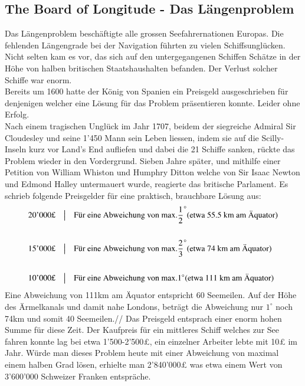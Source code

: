 \begin{refsection}
\section{The Board of Longitude - Das Längenproblem}
Das Längenproblem beschäftigte alle grossen Seefahrernationen Europas. Die fehlenden Längengrade bei der Navigation führten zu vielen Schiffsunglücken. Nicht selten kam es vor, das sich auf den untergegangenen Schiffen Schätze in der Höhe von halben britischen Staatshaushalten befanden. Der Verlust solcher Schiffe war enorm.\\
Bereits um 1600 hatte der König von Spanien ein Preisgeld ausgeschrieben für denjenigen welcher eine Lösung für das Problem präsentieren konnte. Leider ohne Erfolg. \\
Nach einem tragischen Unglück im Jahr 1707, beidem der siegreiche Admiral Sir Cloudesley und seine 1’450 Mann sein Leben liessen, indem sie auf die Scilly-Inseln kurz vor Land’s End aufliefen und dabei die 21 Schiffe sanken, rückte das Problem wieder in den Vordergrund.
Sieben Jahre später, und mithilfe einer Petition von William Whiston und Humphry Ditton welche von Sir Isaac Newton und Edmond Halley untermauert wurde, reagierte das britische Parlament.
Es schrieb folgende Preisgelder für eine praktisch, brauchbare Lösung aus:
\[
\begin{aligned}
&\text{20’000£}
&
&\text{\big \vert}
&
&\text{Für eine Abweichung von max.} \frac{1}{2}^{\circ} \text{(etwa 55.5 km am Äquator)}
\\
\\
&\text{15’000£}
&
&\text{\big \vert}
&
&\text{Für eine Abweichung von max.} \frac{2}{3}^{\circ} \text{(etwa 74 km am Äquator)}
\\
\\
&\text{10’000£}
&
&\text{\big \vert}
&
&\text{Für eine Abweichung von max.} 1 ^{\circ} \text{(etwa 111 km am Äquator)}
\end{aligned}
\]
Eine Abweichung von 111km am Äquator entspricht 60 Seemeilen.
Auf der Höhe des Ärmelkanals und damit nahe Londons, beträgt die Abweichung nur $1 ^{\circ}$ noch 74km und somit 40 Seemeilen.//
Das Preisgeld entsprach einer enorm hohen Summe für diese Zeit. Der Kaufpreis für ein mittleres Schiff welches zur See fahren konnte lag bei etwa 1’500-2’500£, ein einzelner Arbeiter lebte mit 10£ im Jahr.
Würde man dieses Problem heute mit einer Abweichung von maximal einem halben Grad lösen, erhielte man 2’840’000£ was etwa einem Wert von 3’600’000 Schweizer Franken entspräche. 


\end{refsection}
